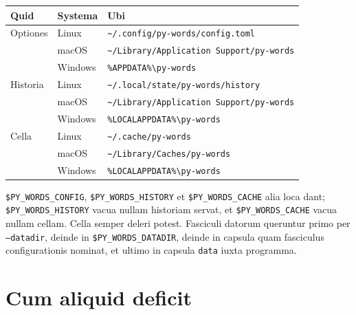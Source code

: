 \documentclass[12pt,
              article,
              oneside
              ]{memoir}
\begin{document}
\begin{longtable}{@{}llp{}@{}}
\toprule
Quid & Systema & Ubi\\
\midrule
\endhead
Optiones & Linux & \texttt{\textasciitilde/.config/py-words/config.toml}\\
 & macOS & \texttt{\textasciitilde/Library/Application Support/py-words}\\
 & Windows & \texttt{\%APPDATA\%\textbackslash py-words}\\
\addlinespace
Historia & Linux & \texttt{\textasciitilde/.local/state/py-words/history}\\
 & macOS & \texttt{\textasciitilde/Library/Application Support/py-words}\\
 & Windows & \texttt{\%LOCALAPPDATA\%\textbackslash py-words}\\
\addlinespace
Cella & Linux & \texttt{\textasciitilde/.cache/py-words}\\
 & macOS & \texttt{\textasciitilde/Library/Caches/py-words}\\
 & Windows & \texttt{\%LOCALAPPDATA\%\textbackslash py-words}\\
\bottomrule
\end{longtable}

\noindent{}%
\texttt{\$PY\_WORDS\_CONFIG}, \texttt{\$PY\_WORDS\_HISTORY} et
\texttt{\$PY\_WORDS\_CACHE} alia loca dant; \texttt{\$PY\_WORDS\_HISTORY}
vacua nullam historiam servat, et \texttt{\$PY\_WORDS\_CACHE} vacua nullam
cellam. Cella semper deleri potest. Fasciculi datorum queruntur primo per
\texttt{--datadir}, deinde in \texttt{\$PY\_WORDS\_DATADIR}, deinde in
capsula quam fasciculus configurationis nominat, et ultimo in capsula
\texttt{data} iuxta programma.

\section{Cum aliquid deficit}
\end{document}

